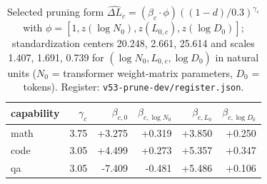 \begin{table}[H]\centering\footnotesize
\begin{tabular}{@{}lrrrrr@{}}
\toprule
capability & $\gamma_c$ & $\beta_{c,0}$ & $\beta_{c,\log N_0}$ & $\beta_{c,L_0}$ & $\beta_{c,\log D_0}$ \\
\midrule
math & 3.75 & +3.275 & +0.319 & +3.850 & +0.250 \\
code & 3.05 & +4.499 & +0.273 & +5.357 & +0.347 \\
qa & 3.05 & -7.409 & -0.481 & +5.486 & +0.106 \\
\bottomrule\end{tabular}
\caption{Selected pruning form $\widehat{\Delta L}_c=(\beta_c\cdot\phi)((1-d)/0.3)^{\gamma_c}$ with $\phi=[1,z(\log N_0),z(L_{0,c}),z(\log D_0)]$; standardization centers 20.248, 2.661, 25.614 and scales 1.407, 1.691, 0.739 for $(\log N_0, L_{0,c}, \log D_0)$ in natural units ($N_0$ = transformer weight-matrix parameters, $D_0$ = tokens). Register: \texttt{v53-prune-dev/register.json}.}
\label{tab:round3_coef}\end{table}
